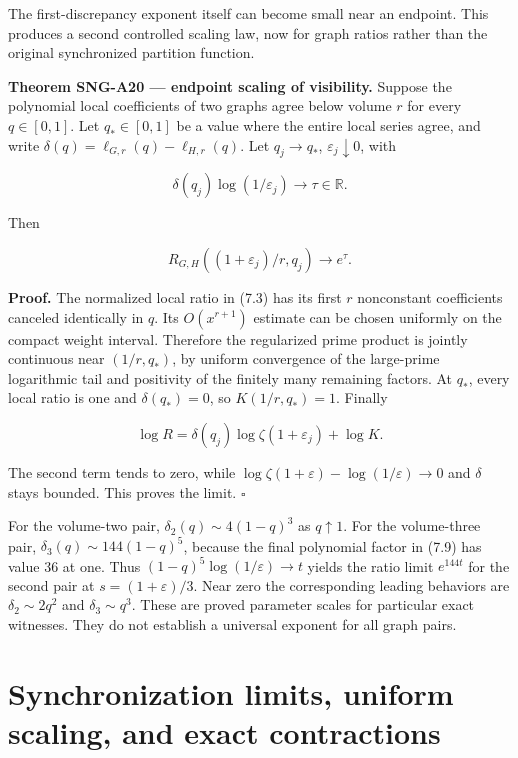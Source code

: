 \documentclass[
  11pt,
  a4paper,
]{report}
\begin{document}
The first-discrepancy exponent itself can become small near an endpoint.
This produces a second controlled scaling law, now for graph ratios
rather than the original synchronized partition function.

\textbf{Theorem SNG-A20 --- endpoint scaling of visibility.} Suppose the
polynomial local coefficients of two graphs agree below volume \(r\) for
every \(q\in[0,1]\). Let \(q_*\in[0,1]\) be a value where the entire
local series agree, and write \(\delta(q)=\ell_{G,r}(q)-\ell_{H,r}(q)\).
Let \(q_j\to q_*\), \(\varepsilon_j\downarrow0\), with

\[
 \delta(q_j)\log(1/\varepsilon_j)\longrightarrow\tau\in\mathbb R.
\]

Then

\[
 R_{G,H}((1+\varepsilon_j)/r,q_j)\longrightarrow e^\tau.
 \tag{7.15}
\]

\textbf{Proof.} The normalized local ratio in (7.3) has its first \(r\)
nonconstant coefficients canceled identically in \(q\). Its
\(O(x^{r+1})\) estimate can be chosen uniformly on the compact weight
interval. Therefore the regularized prime product is jointly continuous
near \((1/r,q_*)\), by uniform convergence of the large-prime
logarithmic tail and positivity of the finitely many remaining factors.
At \(q_*\), every local ratio is one and \(\delta(q_*)=0\), so
\(K(1/r,q_*)=1\). Finally

\[
 \log R=\delta(q_j)\log\zeta(1+\varepsilon_j)+\log K.
\]

The second term tends to zero, while
\(\log\zeta(1+\varepsilon)-\log(1/\varepsilon)\to0\) and \(\delta\)
stays bounded. This proves the limit. \(\square\)

For the volume-two pair, \(\delta_2(q)\sim4(1-q)^3\) as \(q\uparrow1\).
For the volume-three pair, \(\delta_3(q)\sim144(1-q)^5\), because the
final polynomial factor in (7.9) has value 36 at one. Thus
\((1-q)^5\log(1/\varepsilon)\to t\) yields the ratio limit \(e^{144t}\)
for the second pair at \(s=(1+\varepsilon)/3\). Near zero the
corresponding leading behaviors are \(\delta_2\sim2q^2\) and
\(\delta_3\sim q^3\). These are proved parameter scales for particular
exact witnesses. They do not establish a universal exponent for all
graph pairs.

\hypertarget{synchronization-limits-uniform-scaling-and-exact-contractions}{%
\chapter{Synchronization limits, uniform scaling, and exact
contractions}\label{synchronization-limits-uniform-scaling-and-exact-contractions}}
\end{document}
